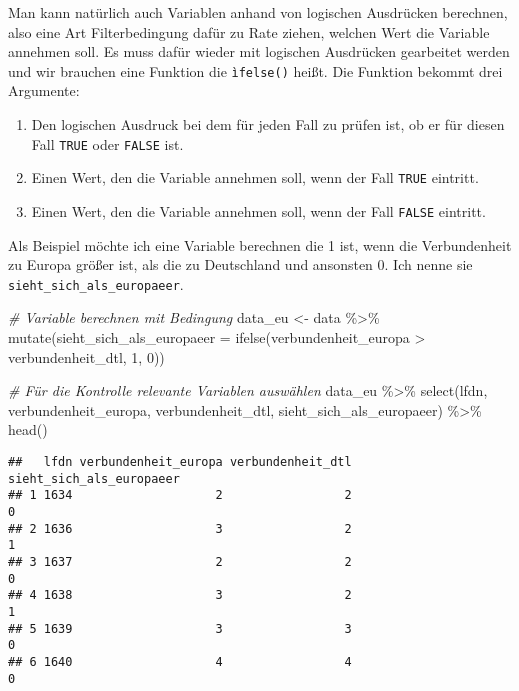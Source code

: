 \documentclass[
]{book}
\newenvironment{Shaded}{\begin{snugshade}}{\end{snugshade}}
\newcommand{\AttributeTok}[1]{\textcolor[rgb]{0.77,0.63,0.00}{#1}}
\newcommand{\CommentTok}[1]{\textcolor[rgb]{0.56,0.35,0.01}{\textit{#1}}}
\newcommand{\DecValTok}[1]{\textcolor[rgb]{0.00,0.00,0.81}{#1}}
\newcommand{\FunctionTok}[1]{\textcolor[rgb]{0.00,0.00,0.00}{#1}}
\newcommand{\NormalTok}[1]{#1}
\newcommand{\OtherTok}[1]{\textcolor[rgb]{0.56,0.35,0.01}{#1}}
\newcommand{\SpecialCharTok}[1]{\textcolor[rgb]{0.00,0.00,0.00}{#1}}
\begin{document}
Man kann natürlich auch Variablen anhand von logischen Ausdrücken berechnen, also eine Art Filterbedingung dafür zu Rate ziehen, welchen Wert die Variable annehmen soll. Es muss dafür wieder mit logischen Ausdrücken gearbeitet werden und wir brauchen eine Funktion die \texttt{ìfelse()} heißt. Die Funktion bekommt drei Argumente:

\begin{enumerate}
\def\labelenumi{\arabic{enumi}.}
\item
  Den logischen Ausdruck bei dem für jeden Fall zu prüfen ist, ob er für diesen Fall \texttt{TRUE} oder \texttt{FALSE} ist.
\item
  Einen Wert, den die Variable annehmen soll, wenn der Fall \texttt{TRUE} eintritt.
\item
  Einen Wert, den die Variable annehmen soll, wenn der Fall \texttt{FALSE} eintritt.
\end{enumerate}

Als Beispiel möchte ich eine Variable berechnen die 1 ist, wenn die Verbundenheit zu Europa größer ist, als die zu Deutschland und ansonsten 0. Ich nenne sie \texttt{sieht\_sich\_als\_europaeer}.

\begin{Shaded}
\begin{Highlighting}[]
\CommentTok{\# Variable berechnen mit Bedingung}
\NormalTok{data\_eu }\OtherTok{\textless{}{-}}\NormalTok{ data }\SpecialCharTok{\%\textgreater{}\%} 
  \FunctionTok{mutate}\NormalTok{(}\AttributeTok{sieht\_sich\_als\_europaeer =} \FunctionTok{ifelse}\NormalTok{(verbundenheit\_europa }\SpecialCharTok{\textgreater{}}\NormalTok{ verbundenheit\_dtl, }\DecValTok{1}\NormalTok{, }\DecValTok{0}\NormalTok{)) }

\CommentTok{\# Für die Kontrolle relevante Variablen auswählen}
\NormalTok{data\_eu }\SpecialCharTok{\%\textgreater{}\%} 
  \FunctionTok{select}\NormalTok{(lfdn, verbundenheit\_europa, verbundenheit\_dtl, sieht\_sich\_als\_europaeer) }\SpecialCharTok{\%\textgreater{}\%}   \FunctionTok{head}\NormalTok{()}
\end{Highlighting}
\end{Shaded}

\begin{verbatim}
##   lfdn verbundenheit_europa verbundenheit_dtl sieht_sich_als_europaeer
## 1 1634                    2                 2                        0
## 2 1636                    3                 2                        1
## 3 1637                    2                 2                        0
## 4 1638                    3                 2                        1
## 5 1639                    3                 3                        0
## 6 1640                    4                 4                        0
\end{verbatim}
\end{document}
